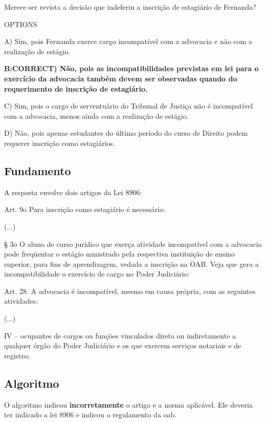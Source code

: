 \documentclass[12pt]{article}
\begin{document}
Merece ser revista a decisão que indeferiu a inscrição de 
estagiário de Fernanda? 
 
OPTIONS

A) Sim, pois Fernanda exerce cargo incompatível com a 
advocacia e não com a realização de estágio. 

\textbf{B:CORRECT) Não, pois as incompatibilidades previstas em lei para o exercício da advocacia também devem ser observadas quando do requerimento de inscrição de estagiário.}

C) Sim, pois o cargo de serventuário do Tribunal de Justiça 
não é incompatível com a advocacia, menos ainda com a 
realização de estágio. 

D) Não, pois apenas estudantes do último período do curso 
de Direito podem requerer inscrição como estagiários. 

\subsection{Fundamento}

A resposta envolve dois artigos da Lei 8906:

Art. 9o Para inscrição como estagiário é necessário:

(...)

§ 3o O aluno de curso jurídico que exerça atividade incompatível com a advocacia pode
freqüentar o estágio ministrado pela respectiva instituição de ensino superior, para fins de
aprendizagem, vedada a inscrição na OAB.
Veja que gera a incompatibilidade o exercício de cargo no Poder Judiciário:

Art. 28. A advocacia é incompatível, mesmo em causa própria, com as seguintes
atividades:

(...)

IV – ocupantes de cargos ou funções vinculados direta ou indiretamente a qualquer órgão
do Poder Judiciário e os que exercem serviços notariais e de registro;

\subsection{Algoritmo}

O algoritmo indicou \textbf{incorretamente} o artigo  e a norma aplicável. Ele deveria ter indicado a lei 8906 e indicou o regulamento da oab.
\end{document}
